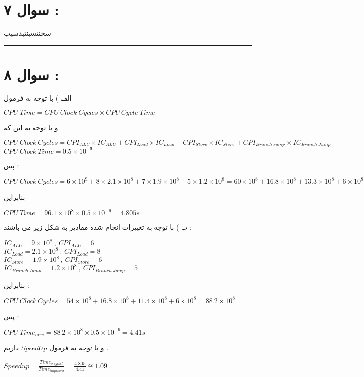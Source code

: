 \documentclass{article}
\begin{document}
\section*{سوال ۷ : }
سخنتسینتبذسیب
\hrule
\section*{سوال ۸  : }
الف ‌) با توجه به فرمول 
\begin{center}
	$ CPU \ Time = CPU \ Clock \ Cycles \times CPU \ Cycle \ Time $
\end{center}
و با توجه به این که 
\begin{center}
	$ CPU  \ Clock \ Cycles = CPI_{ALU} \times IC_{ALU} + CPI_{Load} \times IC_{Load} + CPI_{Store} \times IC_{Store} + CPI_{Branch \ Jump } \times IC_{Branch \ Jump }$ \\
	$ CPU \ Clock \ Time  = 0.5 \times 10^{-9}$
\end{center}
پس  : 
\begin{center}
	$ CPU \ Clock  \ Cycles = 6 \times 10^{9} + 8 \times 2.1 \times 10^8 + 7 \times 1.9 \times 10 ^8 + 5 \times 1.2 \times 10^8 = 60 \times 10 ^8 + 16.8 \times 10^8 + 13.3 \times 10^8 + 6 \times 10^8 = 96.1 \times 10^8$
\end{center}
بنابراین 
\begin{center}
	$CPU \ Time  = 96.1 \times 10 ^8 \times 0.5 \times 10^{-9} = 4.805s$
\end{center}

\newpage
ب ) با توجه به تغییرات انجام شده مقادیر به شکل زیر می باشند  : 
\begin{center}
	$IC_{ALU} = 9 \times 10^8 \ , \ 
	CPI_{ALU} = 6  $\\
	$ IC_{Load} = 2.1 \times 10^8 \ , \ 
	CPI_{Load} = 8$\\
	$ IC_{Store} = 1.9 \times 10^8 \ , \ 
	CPI_{Store} = 6$\\
	$IC_{Branch  \ Jump} = 1.2 \times 10^8 \ , \ 
	CPI_{Branch \ Jump} = 5 $
\end{center}
بنابراین  : 
\begin{center}
	$ CPU \ Clock \ Cycles = 54 \times 10^8 + 16.8 \times 10^8 + 11.4 \times 10^8  + 6 \times 10^8 = 88.2 \times 10^8$
\end{center}
پس  : 
\begin{center}
	$ CPU \ Time_{new}  = 88.2 \times 10^8 \times 0.5 \times 10^{-9} = 4.41s$
\end{center}
و با توجه به فرمول 
$SpeedUp$
داریم  : 
\begin{center}
	$Speedup = \frac{Time_{original} }{Time _{improved}} = \frac{4.805}{4.41} \cong 1.09$
\end{center}
\end{document}
